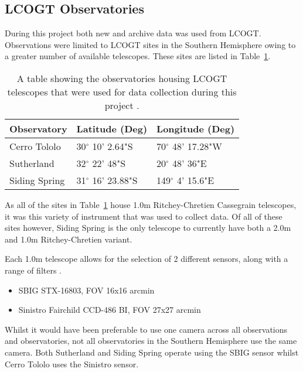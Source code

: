 \documentclass{report}
\begin{document}
\subsection{LCOGT Observatories}
During this project both new and archive data was used from LCOGT. Observations were limited to LCOGT sites in the Southern Hemisphere owing to a greater number of available telescopes. These sites are listed in Table~\ref{observatory}.

\begin{table}
    \centering
    \begin{tabular}{ | l | l | l | }
    \hline \hline
    Observatory & Latitude (Deg) & Longitude (Deg)       \\ \hline \hline
    Cerro Tololo    & 30$^\circ$ 10' 2.64"S & 70$^\circ$ 48' 17.28"W  \\
    Sutherland   & 32$^\circ$ 22' 48"S & 20$^\circ$ 48' 36"E  \\
    Siding Spring  & 31$^\circ$ 16' 23.88"S & 149$^\circ$ 4' 15.6"E \\
    \hline
    \end{tabular}
    \caption{A table showing the observatories housing LCOGT telescopes that were used for data collection during this project \parencite{sites}.}
    \label{observatory}
\end{table}

As all of the sites in Table~\ref{observatory} house 1.0m Ritchey-Chretien Cassegrain telescopes, it was this variety of instrument that was used to collect data. Of all of these sites however, Siding Spring is the only telescope to currently have both a 2.0m and 1.0m Ritchey-Chretien variant. 

Each 1.0m telescope allows for the selection of 2 different sensors, along with a range of filters \parencite{1m}.

\begin{itemize}

  \item SBIG STX-16803, FOV 16x16 arcmin
  \item Sinistro Fairchild CCD-486 BI, FOV 27x27 arcmin

\end{itemize} 

Whilst it would have been preferable to use one camera across all observations and observatories, not all observatories in the Southern Hemisphere use the same camera. Both Sutherland and Siding Spring operate using the SBIG sensor whilst Cerro Tololo uses the Sinistro sensor.    
\end{document}
